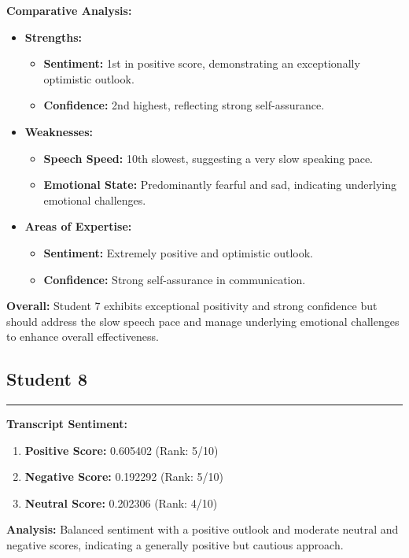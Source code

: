 \documentclass{article}
\begin{document}
\textbf{Comparative Analysis:}
\begin{itemize}
    \item \textbf{Strengths:}
    \begin{itemize}
        \item \textbf{Sentiment:} 1st in positive score, demonstrating an exceptionally optimistic outlook.
        \item \textbf{Confidence:} 2nd highest, reflecting strong self-assurance.
    \end{itemize}
    \item \textbf{Weaknesses:}
    \begin{itemize}
        \item \textbf{Speech Speed:} 10th slowest, suggesting a very slow speaking pace.
        \item \textbf{Emotional State:} Predominantly fearful and sad, indicating underlying emotional challenges.
    \end{itemize}
    \item \textbf{Areas of Expertise:}
    \begin{itemize}
        \item \textbf{Sentiment:} Extremely positive and optimistic outlook.
        \item \textbf{Confidence:} Strong self-assurance in communication.
    \end{itemize}
\end{itemize}

\textbf{Overall:} Student 7 exhibits exceptional positivity and strong confidence but should address the slow speech pace and manage underlying emotional challenges to enhance overall effectiveness.


\subsection{Student 8}
\begin{center}
    \color{green}\rule{1\linewidth}{0.7mm}
\end{center}

\large{\textbf{Transcript Sentiment:}}
\begin{tcolorbox}[ colback=purple!5!white,colframe=purple!75!black,  ,title=Sentiment Breakdown]
    \begin{enumerate}
        \item \textbf{Positive Score:} \textcolor{green!70!black}{0.605402} (Rank: 5/10)
        \item \textbf{Negative Score:} \textcolor{red!70!black}{0.192292} (Rank: 5/10)
        \item \textbf{Neutral Score:} \textcolor{blue!70!black}{0.202306} (Rank: 4/10)
    \end{enumerate}
\end{tcolorbox}
    \textbf{Analysis:} Balanced sentiment with a positive outlook and moderate neutral and negative scores, indicating a generally positive but cautious approach.
\end{document}
